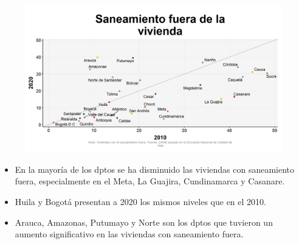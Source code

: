     \begin{figure}[H]
        \caption[Saneamiento fuera de la vivienda por departamentos - 2010 VS 2020 ]{\label{saneamiento_fuera_dptos_vs} }
        \begin{center}
        \includegraphics[width=\textwidth,keepaspectratio]{img/var_195_scatter_time.png}
        \end{center}
    \end{figure}
            \begin{itemize}
                    \item En la mayoría de los dptos se ha disminuido las viviendas con saneamiento fuera, especialmente en el Meta, La Guajira, Cundinamarca y Casanare.
                    \item Huila y Bogotá presentan a 2020 los mismos niveles que en el 2010.
                    \item Arauca, Amazonas, Putumayo y Norte son los dptos que tuvieron un aumento significativo en las viviendas con saneamiento fuera.
                    \end{itemize}

